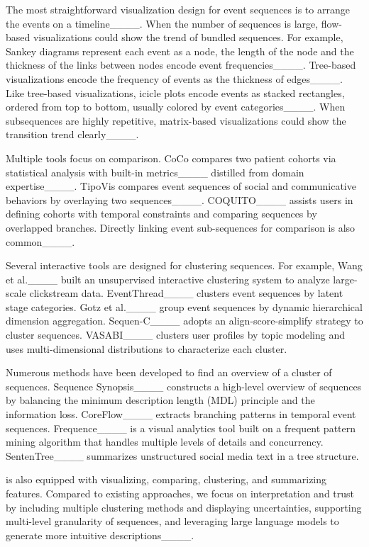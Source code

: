 The most straightforward visualization design for event sequences is to arrange the events on a timeline____. When the number of sequences is large, flow-based visualizations could show the trend of bundled sequences. For example, Sankey diagrams represent each event as a node, the length of the node and the thickness of the links between nodes encode event frequencies____. Tree-based visualizations encode the frequency of events as the thickness of edges____. Like tree-based visualizations, icicle plots encode events as stacked rectangles, ordered from top to bottom, usually colored by event categories____. When subsequences are highly repetitive, matrix-based visualizations could show the transition trend clearly____.

Multiple tools focus on comparison. CoCo compares two patient cohorts via statistical analysis with built-in metrics____ distilled from domain expertise____. TipoVis compares event sequences of social and communicative behaviors by overlaying two sequences____. COQUITO____ assists users in defining cohorts with temporal constraints and comparing sequences by overlapped branches.
Directly linking event sub-sequences for comparison is also common____.  

Several interactive tools are designed for clustering sequences. For example, Wang et al.____ built an unsupervised interactive clustering system to analyze large-scale clickstream data. EventThread____ clusters event sequences by latent stage categories. Gotz et al.____ group event sequences by dynamic hierarchical dimension aggregation. Sequen-C____ adopts an align-score-simplify strategy to cluster sequences. VASABI____ clusters user profiles by topic modeling and uses multi-dimensional distributions to characterize each cluster.

Numerous methods have been developed to find an overview of a cluster of sequences. Sequence Synopsis____ constructs a high-level overview of sequences by balancing the minimum description length (MDL) principle and the information loss. CoreFlow____ extracts branching patterns in temporal event sequences. Frequence____ is a visual analytics tool built on a frequent pattern mining algorithm that handles multiple levels of details and concurrency. SentenTree____ summarizes unstructured social media text in a tree structure. 

\name{} is also equipped with visualizing, comparing, clustering, and summarizing features. Compared to existing approaches, we focus on interpretation and trust by including multiple clustering methods and displaying uncertainties, supporting multi-level granularity of sequences, and leveraging large language models to generate more intuitive descriptions____. 









